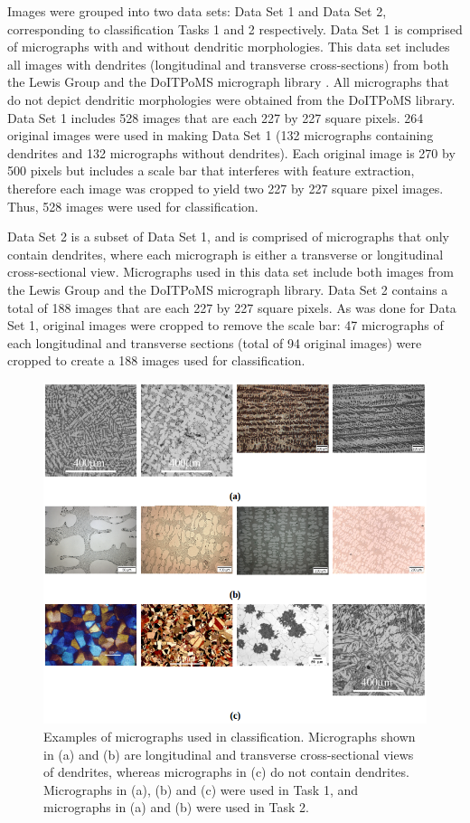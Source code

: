 Images were grouped into two data sets: Data Set 1 and Data Set 2, corresponding to classification Tasks 1 and 2 respectively. Data Set 1 is comprised of micrographs with and without dendritic morphologies.  This data set includes all images with dendrites (longitudinal and transverse cross-sections) from both the Lewis Group and the DoITPoMS micrograph library \cite{Barber2003}.  All micrographs that do not depict dendritic morphologies were obtained from the DoITPoMS library.  Data Set 1 includes 528 images that are each 227 by 227 square pixels. 264 original images were used in making Data Set 1 (132 micrographs containing dendrites and 132 micrographs without dendrites). Each original image is 270 by 500 pixels but includes a scale bar that interferes with feature extraction, therefore each image was cropped to yield two 227 by 227 square pixel images.  Thus, 528 images were used for classification. 

Data Set 2 is a subset of Data Set 1, and is comprised of micrographs that only contain dendrites, where each micrograph is either a transverse or longitudinal cross-sectional view.  Micrographs used in this data set include both images from the Lewis Group and the DoITPoMS micrograph library.  Data Set 2 contains a total of 188 images that are each 227 by 227 square pixels. As was done for Data Set 1, original images were cropped to remove the scale bar: 47 micrographs of each longitudinal and transverse sections (total of 94 original images) were cropped to create a 188 images used for classification.
%
\begin{figure}
  \begin{centering}
 \includegraphics[scale=0.55]{img/example_images_v2.png}
 \caption{Examples of micrographs used in classification.  Micrographs shown in (a) and (b) are longitudinal and transverse cross-sectional views of dendrites, whereas micrographs in (c) do not contain dendrites.  Micrographs in (a), (b) and (c) were used in Task 1, and micrographs in (a) and (b) were used in Task 2.}
 \label{fig:example_images}
 \end{centering}
\end{figure}
